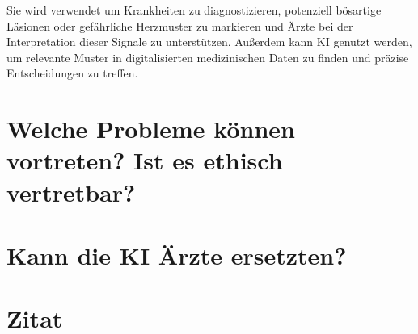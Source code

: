 \documentclass{article}
\begin{document}
Sie wird verwendet um Krankheiten zu diagnostizieren, potenziell bösartige Läsionen oder 
gefährliche Herzmuster zu markieren und Ärzte bei der Interpretation dieser Signale zu unterstützen. 
Außerdem kann KI genutzt werden, um relevante Muster in digitalisierten medizinischen 
Daten zu finden und präzise Entscheidungen zu treffen. 






\section {Welche Probleme können vortreten? Ist es ethisch vertretbar?}


\section{Kann die KI Ärzte ersetzten?}

\section {Zitat}








\printbibliography
\end{document}
